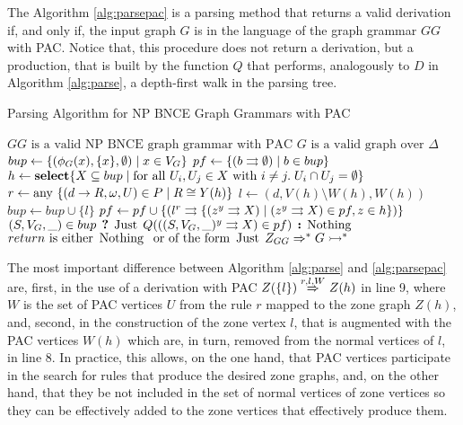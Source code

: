 \documentclass[]{report}
\begin{document}
The Algorithm \ref{alg:parsepac} is a parsing method that returns a valid derivation if, and only if, the input graph $G$ is in the language of the graph grammar $GG$ with PAC. Notice that, this procedure does not return a derivation, but a production, that is built by the function $Q$ that performs, analogously to $D$ in Algorithm \ref{alg:parse}, a depth-first walk in the parsing tree.

\begin{algorithm}[!h]
	\caption{Parsing Algorithm for NP BNCE Graph Grammars with PAC}
	\begin{algorithmic}[1]
		\Require $GG \text{ is a valid NP BNCE graph grammar with PAC}$
		\Require $G \text{ is a valid graph over } \Delta$
		\State $bup \gets \{(\phi_G(x),\{x\},\emptyset) \; | \; x \in V_G\}$
		\State $pf \gets \{ \ptree{b}{}{\emptyset} \st b \in bup \}$
		\Repeat
		\State $h \gets \text{\textbf{select}} \{X \subseteq bup \; | \;\text{for all } U_i, U_j \in X \text{ with } i \neq j . \; U_i \cap U_j = \emptyset \}$
		\State $r \gets \text{any } \{(d \to R,\omega,U) \in P \; | \; R \cong Y(h) \}$
		\State $l \gets (d,V(h)\setminus W(h), W(h))$ 
		 
		\State $bup \gets bup \cup \{l\}$
		\State $pf \gets pf \cup \{ \ptree{l}{r}{\{\ptree{z}{y}{X} \st \ptree{z}{y}{X} \in pf, z \in h \}} \}$
		\EndIf
		\EndFor
		 
		\State \Return $(S, V_G, \_) \in bup \? \Just Q(\ptree{(S,V_G, \_)}{y}{X} \in pf) \: \Nothing $
		\EndFunction
		\Ensure $return \text{ is either } \operatorname{\text{Nothing}}\; \text{ or of the form } \operatorname{\text{Just}}\; Z_{GG} \Rightarrow^*_{} G \rightarrowtail^*$
	\end{algorithmic}
	\label{alg:parsepac}
\end{algorithm}

The most important difference between Algorithm \ref{alg:parse} and \ref{alg:parsepac} are, first, in the use of a derivation with PAC $Z(\{l\}) \overset{r,l,W}{\Rightarrow}_{} Z(h)$ in line 9, where $W$ is the set of PAC vertices $U$ from the rule $r$ mapped to the zone graph $Z(h)$, and, second, in the construction of the zone vertex $l$, that is augmented with the PAC vertices $W(h)$ which are, in turn, removed from the normal vertices of $l$, in line 8. In practice, this allows, on the one hand, that PAC vertices participate in the search for rules that produce the desired zone graphs, and, on the other hand, that they be not included in the set of normal vertices of zone vertices so they can be effectively added to the zone vertices that effectively produce them.
\end{document}
